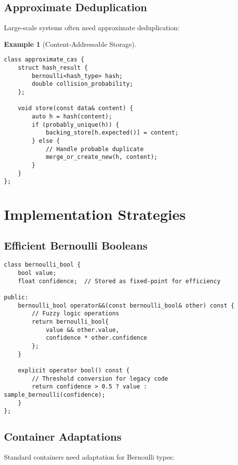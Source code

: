 \documentclass[11pt,final,hidelinks]{article}
\newtheorem{example}[theorem]{Example}
\begin{document}
{\subsection{Approximate Deduplication}

Large-scale systems often need approximate deduplication:

\begin{example}[Content-Addressable Storage]
\begin{verbatim}
class approximate_cas {
    struct hash_result {
        bernoulli<hash_type> hash;
        double collision_probability;
    };
    
    void store(const data& content) {
        auto h = hash(content);
        if (probably_unique(h)) {
            backing_store[h.expected()] = content;
        } else {
            // Handle probable duplicate
            merge_or_create_new(h, content);
        }
    }
};
\end{verbatim}
\end{example}

\section{Implementation Strategies}

\subsection{Efficient Bernoulli Booleans}

\begin{verbatim}
class bernoulli_bool {
    bool value;
    float confidence;  // Stored as fixed-point for efficiency
    
public:
    bernoulli_bool operator&&(const bernoulli_bool& other) const {
        // Fuzzy logic operations
        return bernoulli_bool{
            value && other.value,
            confidence * other.confidence
        };
    }
    
    explicit operator bool() const {
        // Threshold conversion for legacy code
        return confidence > 0.5 ? value : sample_bernoulli(confidence);
    }
};
\end{verbatim}

\subsection{Container Adaptations}

Standard containers need adaptation for Bernoulli types:

}
\end{document}

